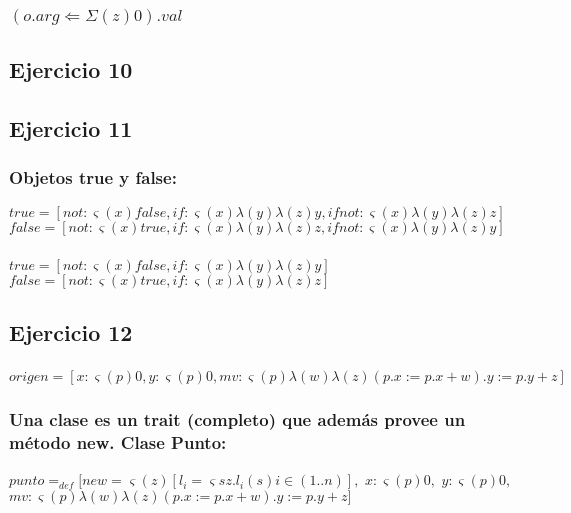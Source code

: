 \documentclass[10pt,a4paper]{article}
\begin{document}
\subsubsection{$(o.arg \Leftarrow \Sigma(z)0).val$}
\subsection{Ejercicio 10}
\subsection{Ejercicio 11}
\subsubsection{Objetos true y false:}
$
true = [not: \varsigma(x)false,if: \varsigma(x)\lambda(y)\lambda(z)y,ifnot: \varsigma(x)\lambda(y)\lambda(z)z]
$ \\
$
false = [not: \varsigma(x)true,if: \varsigma(x)\lambda(y)\lambda(z)z,ifnot: \varsigma(x)\lambda(y)\lambda(z)y]
$
\subsubsection{}
$
true = [not: \varsigma(x)false,if: \varsigma(x)\lambda(y)\lambda(z)y]
$ \\
$
false = [not: \varsigma(x)true,if: \varsigma(x)\lambda(y)\lambda(z)z]
$
\subsection{Ejercicio 12}
\subsubsection{}
$
origen = [x: \varsigma(p)0, y: \varsigma(p)0,mv: \varsigma(p)\lambda(w)\lambda(z) (p.x:=p.x+w).y:=p.y+z]
$
\subsubsection{Una clase es un trait (completo) que además provee un
método new. Clase Punto:}
$
punto =_{def} [new=\varsigma(z)[ l_{i} = \varsigma{s}z.l_{i}(s) i\in(1..n)],$  $x: \varsigma(p)0,$  $y: \varsigma(p)0,$  $mv: \varsigma(p)\lambda(w)\lambda(z) (p.x:=p.x+w).y:=p.y+z]
$
\subsubsection{}
    \begin{lstlisting}
    \end{lstlisting}
\end{document}
